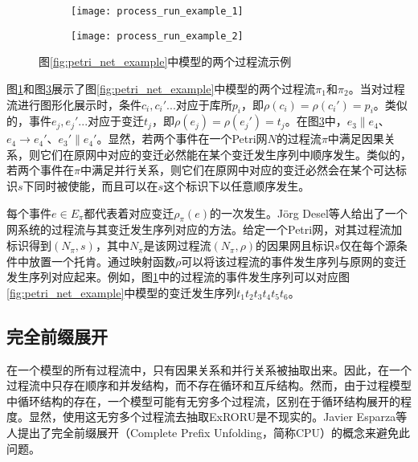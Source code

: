 \begin{figure}[htbp]
  \centering
  \begin{subfigure}{1\textwidth}
  	\centering
  	\texttt{[image: process\_run\_example\_1]}
  	\caption{\label{fig:process_run_example_1}}
  \end{subfigure}
  \begin{subfigure}{1\textwidth}
  	\vspace{1em}
  	\centering
  	\texttt{[image: process\_run\_example\_2]}
  	\caption{\label{fig:process_run_example_2}}
  \end{subfigure}
  \vspace{6pt}
  \caption{图\ref{fig:petri_net_example}中模型的两个过程流示例}
\end{figure}

图\ref{fig:process_run_example_1}和图\ref{fig:process_run_example_2}展示了图\ref{fig:petri_net_example}中模型的两个过程流$\pi_{1}$和$\pi_{2}$。当对过程流进行图形化展示时，条件$c_{i},c_{i}'...$对应于库所$p_{i}$，即$\rho(c_{i})=\rho(c_{i}')=p_{i}$。类似的，事件$e_{j},e_{j}'...$对应于变迁$t_{j}$，即$\rho(e_{j})=\rho(e_{j}')=t_{j}$。在图\ref{fig:process_run_example_2}中，$e_{3}\parallel e_{4}$、$e_{4}\rightarrow e_{4}'$、$e_{3}'\parallel e_{4}'$。显然，若两个事件在一个Petri网$N$的过程流$\pi$中满足因果关系，则它们在原网中对应的变迁必然能在某个变迁发生序列中顺序发生。类似的，若两个事件在$\pi$中满足并行关系，则它们在原网中对应的变迁必然会在某个可达标识$s$下同时被使能，而且可以在$s$这个标识下以任意顺序发生。

每个事件$e\in E_{\pi}$都代表着对应变迁$\rho_{\pi}(e)$的一次发生。J{\"o}rg Desel等人给出了一个网系统的过程流与其变迁发生序列对应的方法\cite{desel2000validation}。给定一个Petri网，对其过程流加标识得到$(N_{\pi},s)$，其中$N_{\pi}$是该网过程流$(N_{\pi},\rho)$的因果网且标识$s$仅在每个源条件中放置一个托肯。通过映射函数$\rho$可以将该过程流的事件发生序列与原网的变迁发生序列对应起来。例如，图\ref{fig:process_run_example_1}中的过程流的事件发生序列可以对应图\ref{fig:petri_net_example}中模型的变迁发生序列$t_{1}t_{2}t_{3}t_{4}t_{5}t_{6}$。

\subsection{完全前缀展开}\label{subsec:cpu}
在一个模型的所有过程流中，只有因果关系和并行关系被抽取出来。因此，在一个过程流中只存在顺序和并发结构，而不存在循环和互斥结构。然而，由于过程模型中循环结构的存在，一个模型可能有无穷多个过程流，区别在于循环结构展开的程度。显然，使用这无穷多个过程流去抽取ExRORU是不现实的。Javier Esparza等人提出了完全前缀展开（Complete Prefix Unfolding，简称CPU）的概念来避免此问题\cite{esparza2002improvement}。

